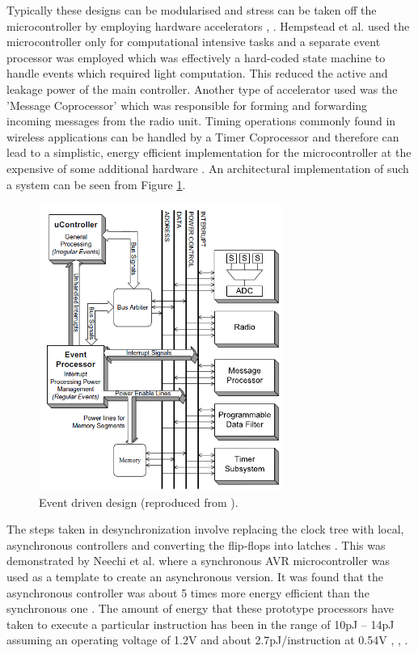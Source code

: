 \documentclass[journal]{IEEEtran}
\begin{document}
Typically these designs can be modularised and stress can be taken off the microcontroller by employing hardware accelerators \cite{SNAP/LE}, \cite{LowPower2005}. Hempstead et al. \cite{LowPower2005} used the microcontroller only for computational intensive tasks and a separate event processor was employed which was effectively a hard-coded state machine to handle events which required light computation. This reduced the active and leakage power of the main controller. Another type of accelerator used was the 'Message Coprocessor' which was responsible for forming and forwarding incoming messages from the radio unit. Timing operations commonly found in wireless applications can be handled by a Timer Coprocessor and therefore can lead to a simplistic, energy efficient implementation for the microcontroller at the expensive of some additional hardware \cite{LowPower2005}. An architectural implementation of such a system can be seen from Figure \ref{Figure:Async}. \\
	
	\begin{figure}[h]
	   \centering
	   \includegraphics[width = 8cm]{Async}
	   \caption{Event driven design (reproduced from \cite{LowPower2005}).}
	   \label{Figure:Async}
	\end{figure}	
	\FloatBarrier
	
The steps taken in desynchronization involve replacing the clock tree with local, asynchronous controllers and converting the flip-flops into latches \cite{AVR}. This was demonstrated by Neechi et al. \cite{AVR} where a synchronous AVR microcontroller was used as a template to create an asynchronous version. It was found that the asynchronous controller was about 5 times more energy efficient than the synchronous one \cite{AVR}. The amount of energy that these prototype processors have taken to execute a particular instruction has been in the range of 10pJ – 14pJ assuming an operating voltage of 1.2V and about 2.7pJ/instruction at 0.54V \cite{SNAP/LE}, \cite{AVR}, \cite{SmartDust}.
	 
\end{document}
